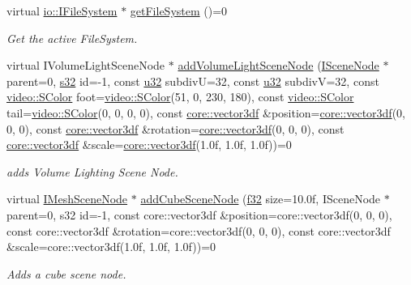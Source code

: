\begin{DoxyCompactItemize}
virtual \hyperlink{classirr_1_1io_1_1IFileSystem}{io\+::\+I\+File\+System} $\ast$ \hyperlink{classirr_1_1scene_1_1ISceneManager_adbd98fbeba199005cf795a5bae7ccbaf}{get\+File\+System} ()=0
\begin{DoxyCompactList}\small\item\em Get the active File\+System. \end{DoxyCompactList}\item 
virtual I\+Volume\+Light\+Scene\+Node $\ast$ \hyperlink{classirr_1_1scene_1_1ISceneManager_a75fc84dd6ee9140da8fd63357947c724}{add\+Volume\+Light\+Scene\+Node} (\hyperlink{classirr_1_1scene_1_1ISceneNode}{I\+Scene\+Node} $\ast$parent=0, \hyperlink{namespaceirr_ac66849b7a6ed16e30ebede579f9b47c6}{s32} id=-\/1, const \hyperlink{namespaceirr_a0416a53257075833e7002efd0a18e804}{u32} subdivU=32, const \hyperlink{namespaceirr_a0416a53257075833e7002efd0a18e804}{u32} subdivV=32, const \hyperlink{classirr_1_1video_1_1SColor}{video\+::\+S\+Color} foot=\hyperlink{classirr_1_1video_1_1SColor}{video\+::\+S\+Color}(51, 0, 230, 180), const \hyperlink{classirr_1_1video_1_1SColor}{video\+::\+S\+Color} tail=\hyperlink{classirr_1_1video_1_1SColor}{video\+::\+S\+Color}(0, 0, 0, 0), const \hyperlink{namespaceirr_1_1core_ae6e2b2a6c552833ebbd5b7463d03586b}{core\+::vector3df} \&position=\hyperlink{namespaceirr_1_1core_ae6e2b2a6c552833ebbd5b7463d03586b}{core\+::vector3df}(0, 0, 0), const \hyperlink{namespaceirr_1_1core_ae6e2b2a6c552833ebbd5b7463d03586b}{core\+::vector3df} \&rotation=\hyperlink{namespaceirr_1_1core_ae6e2b2a6c552833ebbd5b7463d03586b}{core\+::vector3df}(0, 0, 0), const \hyperlink{namespaceirr_1_1core_ae6e2b2a6c552833ebbd5b7463d03586b}{core\+::vector3df} \&scale=\hyperlink{namespaceirr_1_1core_ae6e2b2a6c552833ebbd5b7463d03586b}{core\+::vector3df}(1.\+0f, 1.\+0f, 1.\+0f))=0
\begin{DoxyCompactList}\small\item\em adds Volume Lighting Scene Node. \end{DoxyCompactList}\item 
virtual \hyperlink{classirr_1_1scene_1_1IMeshSceneNode}{I\+Mesh\+Scene\+Node} $\ast$ \hyperlink{classirr_1_1scene_1_1ISceneManager_a23d1328c68b1585f613108f386fabc1c}{add\+Cube\+Scene\+Node} (\hyperlink{namespaceirr_a0277be98d67dc26ff93b1a6a1d086b07}{f32} size=10.\+0f, I\+Scene\+Node $\ast$parent=0, s32 id=-\/1, const core\+::vector3df \&position=core\+::vector3df(0, 0, 0), const core\+::vector3df \&rotation=core\+::vector3df(0, 0, 0), const core\+::vector3df \&scale=core\+::vector3df(1.\+0f, 1.\+0f, 1.\+0f))=0
\begin{DoxyCompactList}\small\item\em Adds a cube scene node. \end{DoxyCompactList}\item 

\end{DoxyCompactItemize}

